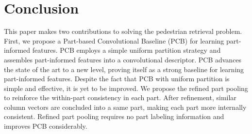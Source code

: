 \documentclass[10pt,twocolumn,letterpaper]{article}
\begin{document}
\section{Conclusion}
This paper makes two contributions to solving the pedestrian retrieval problem. First, we propose a Part-based Convolutional Baseline (PCB) for learning part-informed features. PCB employs a simple uniform partition strategy and assembles part-informed features into a convolutional descriptor. PCB advances the state of the art to a new level, proving itself as a strong baseline for learning part-informed features. 
Despite the fact that PCB with uniform partition is simple and effective, it is yet to be improved. We propose the refined part pooling to reinforce the within-part consistency in each part. After refinement, similar column vectors are concluded into a same part, making each part more internally consistent. Refined part pooling requires no part labeling information and improves PCB considerably. 






{\small


}
\end{document}
